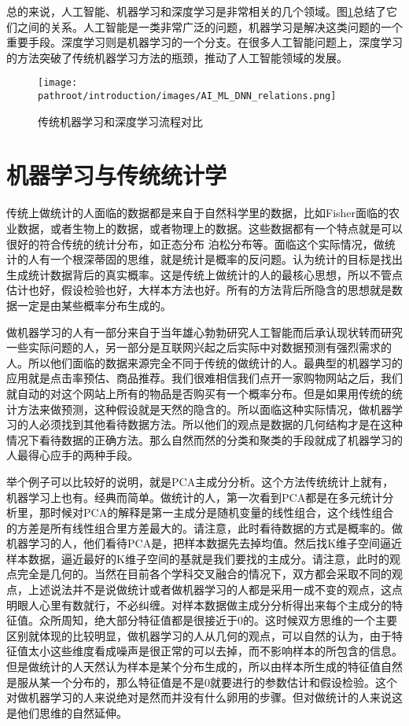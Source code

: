 \documentclass[10pt,a4paper]{ctexbook}
\providecommand{\pathroot}{..}
\begin{document}
总的来说，人工智能、机器学习和深度学习是非常相关的几个领域。图\ref{fig:AI_ML_DNN_relations}总结了它们之间的关系。人工智能是一类非常广泛的问题，机器学习是解决这类问题的一个重要手段。深度学习则是机器学习的一个分支。在很多人工智能问题上，深度学习的方法突破了传统机器学习方法的瓶颈，推动了人工智能领域的发展。

\begin{figure}[ht]
    \centering
    \texttt{[image: \\pathroot/introduction/images/AI\_ML\_DNN\_relations.png]}
    \caption{传统机器学习和深度学习流程对比}
    \label{fig:AI_ML_DNN_relations}
\end{figure}


\section{机器学习与传统统计学}
传统上做统计的人面临的数据都是来自于自然科学里的数据，比如Fisher面临的农业数据，或者生物上的数据，或者物理上的数据。这些数据都有一个特点就是可以很好的符合传统的统计分布，如正态分布 泊松分布等。面临这个实际情况，做统计的人有一个根深蒂固的思维，就是统计是概率的反问题。认为统计的目标是找出生成统计数据背后的真实概率。这是传统上做统计的人的最核心思想，所以不管点估计也好，假设检验也好，大样本方法也好。所有的方法背后所隐含的思想就是数据一定是由某些概率分布生成的。

做机器学习的人有一部分来自于当年雄心勃勃研究人工智能而后承认现状转而研究一些实际问题的人，另一部分是互联网兴起之后实际中对数据预测有强烈需求的人。所以他们面临的数据来源完全不同于传统的做统计的人。最典型的机器学习的应用就是点击率预估、商品推荐。我们很难相信我们点开一家购物网站之后，我们就自动的对这个网站上所有的物品是否购买有一个概率分布。但是如果用传统的统计方法来做预测，这种假设就是天然的隐含的。所以面临这种实际情况，做机器学习的人必须找到其他看待数据方法。所以他们的观点是数据的几何结构才是在这种情况下看待数据的正确方法。那么自然而然的分类和聚类的手段就成了机器学习的人最得心应手的两种手段。

举个例子可以比较好的说明，就是PCA主成分分析。这个方法传统统计上就有，机器学习上也有。经典而简单。做统计的人，第一次看到PCA都是在多元统计分析里，那时候对PCA的解释是第一主成分是随机变量的线性组合，这个线性组合的方差是所有线性组合里方差最大的。请注意，此时看待数据的方式是概率的。做机器学习的人，他们看待PCA是，把样本数据先去掉均值。然后找K维子空间逼近样本数据，逼近最好的K维子空间的基就是我们要找的主成分。请注意，此时的观点完全是几何的。当然在目前各个学科交叉融合的情况下，双方都会采取不同的观点，上述说法并不是说做统计或者做机器学习的人都是采用一成不变的观点，这点明眼人心里有数就行，不必纠缠。对样本数据做主成分分析得出来每个主成分的特征值。众所周知，绝大部分特征值都是很接近于0的。这时候双方思维的一个主要区别就体现的比较明显，做机器学习的人从几何的观点，可以自然的认为，由于特征值太小这些维度看成噪声是很正常的可以去掉，而不影响样本的所包含的信息。但是做统计的人天然认为样本是某个分布生成的，所以由样本所生成的特征值自然是服从某一个分布的，那么特征值是不是0就要进行的参数估计和假设检验。这个对做机器学习的人来说绝对是然而并没有什么卵用的步骤。但对做统计的人来说这是他们思维的自然延伸。
\end{document}
